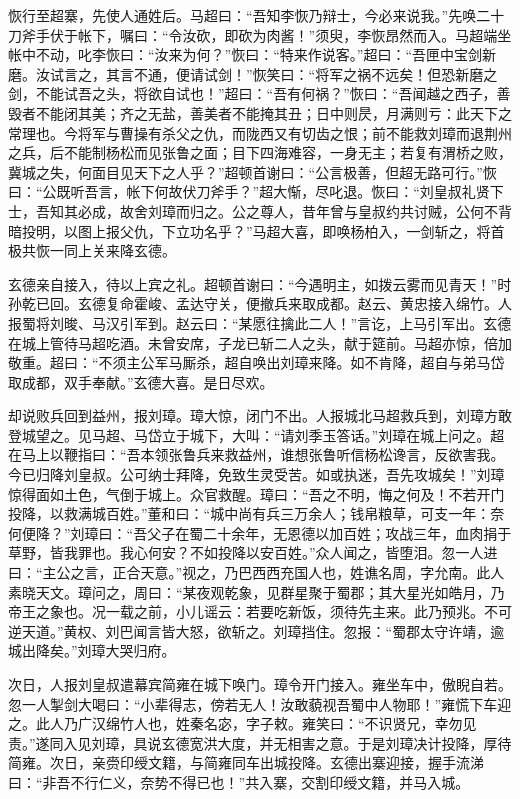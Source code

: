 恢行至超寨，先使人通姓后。马超曰：“吾知李恢乃辩士，今必来说我。”先唤二十刀斧手伏于帐下，嘱曰：“令汝砍，即砍为肉酱！”须臾，李恢昂然而入。马超端坐帐中不动，叱李恢曰：“汝来为何？”恢曰：“特来作说客。”超曰：“吾匣中宝剑新磨。汝试言之，其言不通，便请试剑！”恢笑曰：“将军之祸不远矣！但恐新磨之剑，不能试吾之头，将欲自试也！”超曰：“吾有何祸？”恢曰：“吾闻越之西子，善毁者不能闭其美；齐之无盐，善美者不能掩其丑；日中则昃，月满则亏：此天下之常理也。今将军与曹操有杀父之仇，而陇西又有切齿之恨；前不能救刘璋而退荆州之兵，后不能制杨松而见张鲁之面；目下四海难容，一身无主；若复有渭桥之败，冀城之失，何面目见天下之人乎？”超顿首谢曰：“公言极善，但超无路可行。”恢曰：“公既听吾言，帐下何故伏刀斧手？”超大惭，尽叱退。恢曰：“刘皇叔礼贤下士，吾知其必成，故舍刘璋而归之。公之尊人，昔年曾与皇叔约共讨贼，公何不背暗投明，以图上报父仇，下立功名乎？”马超大喜，即唤杨柏入，一剑斩之，将首极共恢一同上关来降玄德。

玄德亲自接入，待以上宾之礼。超顿首谢曰：“今遇明主，如拨云雾而见青天！”时孙乾已回。玄德复命霍峻、孟达守关，便撤兵来取成都。赵云、黄忠接入绵竹。人报蜀将刘晙、马汉引军到。赵云曰：“某愿往擒此二人！”言讫，上马引军出。玄德在城上管待马超吃酒。未曾安席，子龙已斩二人之头，献于筵前。马超亦惊，倍加敬重。超曰：“不须主公军马厮杀，超自唤出刘璋来降。如不肯降，超自与弟马岱取成都，双手奉献。”玄德大喜。是日尽欢。

却说败兵回到益州，报刘璋。璋大惊，闭门不出。人报城北马超救兵到，刘璋方敢登城望之。见马超、马岱立于城下，大叫：“请刘季玉答话。”刘璋在城上问之。超在马上以鞭指曰：“吾本领张鲁兵来救益州，谁想张鲁听信杨松谗言，反欲害我。今已归降刘皇叔。公可纳士拜降，免致生灵受苦。如或执迷，吾先攻城矣！”刘璋惊得面如土色，气倒于城上。众官救醒。璋曰：“吾之不明，悔之何及！不若开门投降，以救满城百姓。”董和曰：“城中尚有兵三万余人；钱帛粮草，可支一年：奈何便降？”刘璋曰：“吾父子在蜀二十余年，无恩德以加百姓；攻战三年，血肉捐于草野，皆我罪也。我心何安？不如投降以安百姓。”众人闻之，皆堕泪。忽一人进曰：“主公之言，正合天意。”视之，乃巴西西充国人也，姓谯名周，字允南。此人素晓天文。璋问之，周曰：“某夜观乾象，见群星聚于蜀郡；其大星光如皓月，乃帝王之象也。况一载之前，小儿谣云：若要吃新饭，须待先主来。此乃预兆。不可逆天道。”黄权、刘巴闻言皆大怒，欲斩之。刘璋挡住。忽报：“蜀郡太守许靖，逾城出降矣。”刘璋大哭归府。

次日，人报刘皇叔遣幕宾简雍在城下唤门。璋令开门接入。雍坐车中，傲睨自若。忽一人掣剑大喝曰：“小辈得志，傍若无人！汝敢藐视吾蜀中人物耶！”雍慌下车迎之。此人乃广汉绵竹人也，姓秦名宓，字子敕。雍笑曰：“不识贤兄，幸勿见责。”遂同入见刘璋，具说玄德宽洪大度，并无相害之意。于是刘璋决计投降，厚待简雍。次日，亲赍印绶文籍，与简雍同车出城投降。玄德出寨迎接，握手流涕曰：“非吾不行仁义，奈势不得已也！”共入寨，交割印绶文籍，并马入城。

